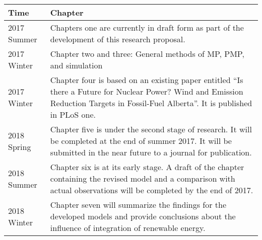 \begin{longtable}[]{@{}ll@{}}
\toprule
Time & Chapter\tabularnewline
\midrule
\endhead
2017 Summer & Chapters one are currently in draft form as part of the
development of this research proposal.\tabularnewline
2017 Winter & Chapter two and three: General methods of MP, PMP, and
simulation\tabularnewline
2017 Winter & Chapter four is based on an existing paper entitled ``Is
there a Future for Nuclear Power? Wind and Emission Reduction Targets in
Fossil-Fuel Alberta''. It is published in PLoS one.\tabularnewline
2018 Spring & Chapter five is under the second stage of research. It
will be completed at the end of summer 2017. It will be submitted in the
near future to a journal for publication.\tabularnewline
2018 Summer & Chapter six is at its early stage. A draft of the chapter
containing the revised model and a comparison with actual observations
will be completed by the end of 2017.\tabularnewline
2018 Winter & Chapter seven will summarize the findings for the
developed models and provide conclusions about the influence of
integration of renewable energy.\tabularnewline
\bottomrule

\end{longtable}